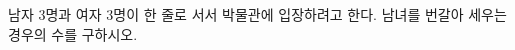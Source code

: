\hspace*{2mm}\begin{minipage}[t]{\dimexpr\linewidth-2mm\relax}\vspace{0pt}
남자 $3$명과 여자 $3$명이 한 줄로 서서 박물관에 입장하려고 한다. 남녀를 번갈아 세우는 경우의 수를 구하시오.\end{minipage}
